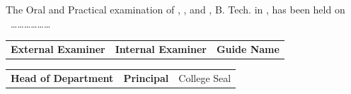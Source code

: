 \vspace{1\baselineskip}
\noindent
{The Oral and Practical examination of \textbf{{\studentNamea}}, \textbf{{\studentNameb}}, \textbf{{\studentNamec}} and \textbf{{\studentNamed}}, B. Tech. in \branch, has been held on \ ………………}

\vspace{5\baselineskip}

\begin{tabular}{p{}p{}p{}}
\textbf{External Examiner} & \textbf{Internal Examiner} & \textbf{Guide Name}
\end{tabular}

\vspace{4\baselineskip}

\begin{tabular}{p{}p{}p{}}
\textbf{Head of Department} & \textbf{Principal} & College Seal
\end{tabular}


\bigskip